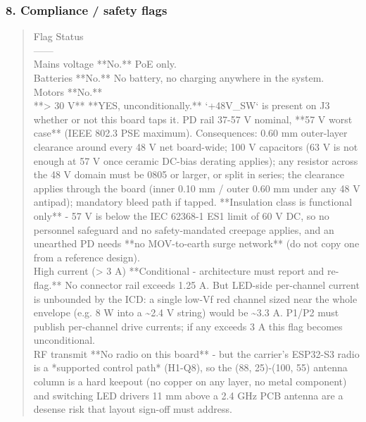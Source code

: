 \documentclass[11pt,a4paper]{article}
\begin{document}
\subsubsection*{8. Compliance / safety flags}
\begin{quote}\small\ttfamily\raggedright
\textbar{} Flag \textbar{} Status \textbar{}\\
\textbar{}---\textbar{}---\textbar{}\\
\textbar{} Mains voltage \textbar{} {*}{*}No.{*}{*} PoE only. \textbar{}\\
\textbar{} Batteries \textbar{} {*}{*}No.{*}{*} No battery, no charging anywhere in the system. \textbar{}\\
\textbar{} Motors \textbar{} {*}{*}No.{*}{*} \textbar{}\\
\textbar{} {*}{*}\textgreater{} 30 V{*}{*} \textbar{} {*}{*}YES, unconditionally.{*}{*} `+48V\_SW` is present on J3 whether or not this board taps it. PD rail 37-57 V nominal, {*}{*}57 V worst case{*}{*} (IEEE 802.3 PSE maximum). Consequences: 0.60 mm outer-layer clearance around every 48 V net board-wide; 100 V capacitors (63 V is not enough at 57 V once ceramic DC-bias derating applies); any resistor across the 48 V domain must be 0805 or larger, or split in series; the clearance applies through the board (inner 0.10 mm / outer 0.60 mm under any 48 V antipad); mandatory bleed path if tapped. {*}{*}Insulation class is functional only{*}{*} - 57 V is below the IEC 62368-1 ES1 limit of 60 V DC, so no personnel safeguard and no safety-mandated creepage applies, and an unearthed PD needs {*}{*}no MOV-to-earth surge network{*}{*} (do not copy one from a reference design). \textbar{}\\
\textbar{} High current (\textgreater{} 3 A) \textbar{} {*}{*}Conditional - architecture must report and re-flag.{*}{*} No connector rail exceeds 1.25 A. But LED-side per-channel current is unbounded by the ICD: a single low-Vf red channel sized near the whole envelope (e.g. 8 W into a \textasciitilde{}2.4 V string) would be \textasciitilde{}3.3 A. P1/P2 must publish per-channel drive currents; if any exceeds 3 A this flag becomes unconditional. \textbar{}\\
\textbar{} RF transmit \textbar{} {*}{*}No radio on this board{*}{*} - but the carrier's ESP32-S3 radio is a {*}supported control path{*} (H1-Q8), so the (88, 25)-(100, 55) antenna column is a hard keepout (no copper on any layer, no metal component) and switching LED drivers 11 mm above a 2.4 GHz PCB antenna are a desense risk that layout sign-off must address. \textbar{}\\

\end{quote}
\end{document}

